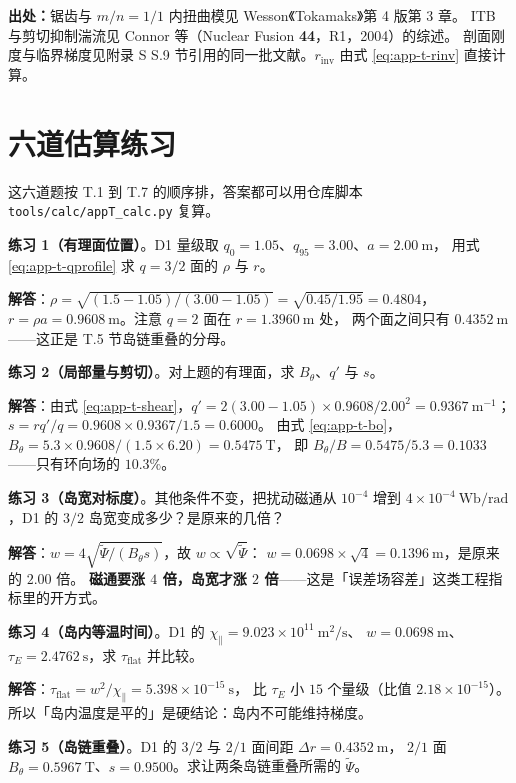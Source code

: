 {\footnotesize
\textbf{出处：}锯齿与 $m/n=1/1$ 内扭曲模见 Wesson《Tokamaks》第 4 版第 3 章。
ITB 与剪切抑制湍流见 Connor 等（Nuclear Fusion \textbf{44}，R1，2004）的综述。
剖面刚度与临界梯度见附录 S S.9 节引用的同一批文献。$r_{\mathrm{inv}}$ 由式
\eqref{eq:app-t-rinv} 直接计算。
}

\section{六道估算练习}
\label{sec:app-t-problems}

这六道题按 T.1 到 T.7 的顺序排，答案都可以用仓库脚本 \texttt{tools/\allowbreak{}calc/\allowbreak{}appT\_calc.py} 复算。

\textbf{练习 1（有理面位置）}。D1 量级取 $q_0=1.05$、$q_{95}=3.00$、$a=2.00\ \mathrm{m}$，
用式 \eqref{eq:app-t-qprofile} 求 $q=3/2$ 面的 $\rho$ 与 $r$。

\textbf{解答}：$\rho=\sqrt{(1.5-1.05)/(3.00-1.05)}=\sqrt{0.45/1.95}=0.4804$，
$r=\rho a=0.9608\ \mathrm{m}$。注意 $q=2$ 面在 $r=1.3960\ \mathrm{m}$ 处，
两个面之间只有 $0.4352\ \mathrm{m}$——这正是 T.5 节岛链重叠的分母。

\textbf{练习 2（局部量与剪切）}。对上题的有理面，求 $B_\theta$、$q'$ 与 $s$。

\textbf{解答}：由式 \eqref{eq:app-t-shear}，$q'=2(3.00-1.05)\times0.9608/2.00^2=0.9367\ \mathrm{m^{-1}}$；
$s=rq'/q=0.9608\times0.9367/1.5=0.6000$。
由式 \eqref{eq:app-t-bo}，$B_\theta=5.3\times0.9608/(1.5\times6.20)=0.5475\ \mathrm{T}$，
即 $B_\theta/B=0.5475/5.3=0.1033$——只有环向场的 $10.3\%$。

\textbf{练习 3（岛宽对标度）}。其他条件不变，把扰动磁通从 $10^{-4}$ 增到
$4\times10^{-4}\ \mathrm{Wb/rad}$，D1 的 $3/2$ 岛宽变成多少？是原来的几倍？

\textbf{解答}：$w=4\sqrt{\tilde\Psi/(B_\theta s)}$，故 $w\propto\sqrt{\tilde\Psi}$：
$w=0.0698\times\sqrt4=0.1396\ \mathrm{m}$，是原来的 $2.00$ 倍。
\textbf{磁通要涨 $4$ 倍，岛宽才涨 $2$ 倍}——这是「误差场容差」这类工程指标里的开方式。

\textbf{练习 4（岛内等温时间）}。D1 的 $\chi_\parallel=9.023\times10^{11}\ \mathrm{m^2/s}$、
$w=0.0698\ \mathrm{m}$、$\tau_E=2.4762\ \mathrm{s}$，求 $\tau_{\mathrm{flat}}$ 并比较。

\textbf{解答}：$\tau_{\mathrm{flat}}=w^2/\chi_\parallel=5.398\times10^{-15}\ \mathrm{s}$，
比 $\tau_E$ 小 $15$ 个量级（比值 $2.18\times10^{-15}$）。
所以「岛内温度是平的」是硬结论：岛内不可能维持梯度。

\textbf{练习 5（岛链重叠）}。D1 的 $3/2$ 与 $2/1$ 面间距 $\Delta r=0.4352\ \mathrm{m}$，
$2/1$ 面 $B_\theta=0.5967\ \mathrm{T}$、$s=0.9500$。求让两条岛链重叠所需的 $\tilde\Psi$。


